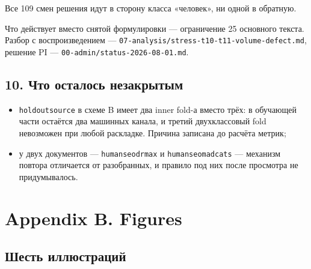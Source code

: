 \documentclass[11pt,a4paper]{article}
\renewcommand{\_}{\textunderscore\allowbreak}
\begin{document}
Все 109 смен решения идут в сторону класса «человек», ни одной в обратную.

Что действует вместо снятой формулировки — ограничение 25 основного текста.
Разбор с воспроизведением — \texttt{07-\allowbreak{}analysis/stress-\allowbreak{}t10-\allowbreak{}t11-\allowbreak{}volume-\allowbreak{}defect.md},
решение PI — \texttt{00-\allowbreak{}admin/status-\allowbreak{}2026-\allowbreak{}08-\allowbreak{}01.md}.

\subsection{10. Что осталось незакрытым}

\begin{itemize}
\item \texttt{holdout\_source} в схеме B имеет два inner fold-а вместо трёх: в обучающей части остаётся два машинных канала, и третий двухклассовый fold невозможен при любой раскладке. Причина записана до расчёта метрик;
\item у двух документов — \texttt{human\_seo\_drmax\_0013} и \texttt{human\_seo\_madcats\_0005} — механизм повтора отличается от разобранных, и правило под них после просмотра не придумывалось.
\end{itemize}

\section{Appendix B. Figures}

\subsection{Шесть иллюстраций}
\end{document}
